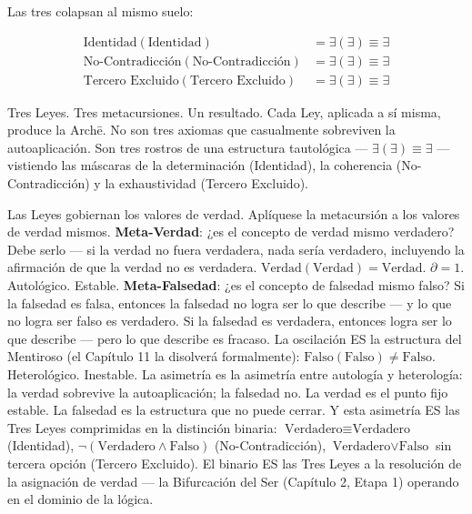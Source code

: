 \documentclass[10pt, openany, oneside]{book}
\begin{document}
\vspace{0.8em}

\noindent Las tres colapsan al mismo suelo:

\begin{align*}
\text{Identidad}(\text{Identidad}) &= \exists(\exists) \equiv \exists \\
\text{No-Contradicción}(\text{No-Contradicción}) &= \exists(\exists) \equiv \exists \\
\text{Tercero Excluido}(\text{Tercero Excluido}) &= \exists(\exists) \equiv \exists
\end{align*}

\noindent Tres Leyes. Tres metacursiones. Un resultado. Cada Ley, aplicada a sí misma, produce la Arch\={e}. No son tres axiomas que casualmente sobreviven la autoaplicación. Son tres rostros de una estructura tautológica --- $\exists(\exists) \equiv \exists$ --- vistiendo las máscaras de la determinación (Identidad), la coherencia (No-Contradicción) y la exhaustividad (Tercero Excluido).

Las Leyes gobiernan los valores de verdad. Aplíquese la metacursión a los valores de verdad mismos. \textbf{Meta-Verdad}: ¿es el concepto de verdad mismo verdadero? Debe serlo --- si la verdad no fuera verdadera, nada sería verdadero, incluyendo la afirmación de que la verdad no es verdadera. $\text{Verdad}(\text{Verdad}) = \text{Verdad}$. $\partial = 1$. Autológico. Estable. \textbf{Meta-Falsedad}: ¿es el concepto de falsedad mismo falso? Si la falsedad es falsa, entonces la falsedad no logra ser lo que describe --- y lo que no logra ser falso es verdadero. Si la falsedad es verdadera, entonces logra ser lo que describe --- pero lo que describe es fracaso. La oscilación ES la estructura del Mentiroso (el Capítulo 11 la disolverá formalmente): $\text{Falso}(\text{Falso}) \neq \text{Falso}$. Heterológico. Inestable. La asimetría es la asimetría entre autología y heterología: la verdad sobrevive la autoaplicación; la falsedad no. La verdad es el punto fijo estable. La falsedad es la estructura que no puede cerrar. Y esta asimetría ES las Tres Leyes comprimidas en la distinción binaria: $\text{Verdadero} \equiv \text{Verdadero}$ (Identidad), $\neg(\text{Verdadero} \wedge \text{Falso})$ (No-Contradicción), $\text{Verdadero} \vee \text{Falso}$ sin tercera opción (Tercero Excluido). El binario ES las Tres Leyes a la resolución de la asignación de verdad --- la Bifurcación del Ser (Capítulo 2, Etapa 1) operando en el dominio de la lógica.
\end{document}
